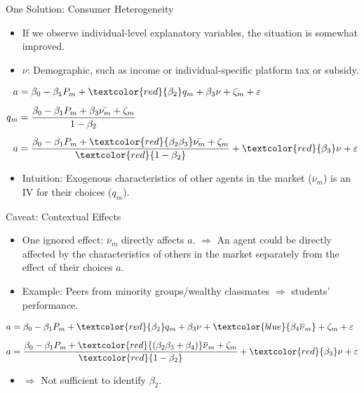 \documentclass[aspectratio=169]{beamer}  %
\begin{document}
\begin{frame}{One Solution: Consumer Heterogeneity}
    \begin{itemize}
        \item If we observe individual-level explanatory variables, the situation is somewhat improved.
        \item $\nu$: Demographic, such as income or individual-specific platform tax or subsidy.
    \end{itemize}
    \begin{align*}
        a &= \beta_0 - \beta_1P_m + \textcolor{red}{\beta_2}q_m + \beta_3\nu + \zeta_m + \varepsilon \\[5pt]
        q_m &= \frac{\beta_0-\beta_1P_m+\beta_3\bar{\nu_m} + \zeta_m}{1-\beta_2} \\[5pt]
        a &= \frac{\beta_0-\beta_1P_m+\textcolor{red}{\beta_2\beta_3}\bar{\nu_m} + \zeta_m}{\textcolor{red}{1-\beta_2}} + \textcolor{red}{\beta_3}\nu + \varepsilon
    \end{align*}
    \vspace{-0.2cm}
    \begin{itemize}
        \item Intuition: Exogenous characteristics of other agents in the market ($\overline{\nu}_m$) is an IV for their choices ($q_m$).
    \end{itemize}
\end{frame}

\begin{frame}{Caveat: Contextual Effects}
    \begin{itemize}
        \item One ignored effect: $\overline{\nu}_m$ directly affects $a$. $\Rightarrow$ An agent could be directly affected by the characteristics of others in the market separately from the effect of their choices $a$.
        \item Example: Peers from minority groups/wealthy classmates $\Rightarrow$ students' performance.
    \end{itemize}
    \begin{align*}
        a &= \beta_0 - \beta_1P_m + \textcolor{red}{\beta_2}q_m + \beta_3\nu + \textcolor{blue}{\beta_4\overline{\nu}_m}+\zeta_m + \varepsilon \\[5pt]
        a &= \frac{\beta_0-\beta_1P_m+\textcolor{red}{(\beta_2\beta_3+\beta_4)}\overline{\nu}_m + \zeta_m}{\textcolor{red}{1-\beta_2}} + \textcolor{red}{\beta_3}\nu + \varepsilon
    \end{align*}
    \begin{itemize}
        \item $\Rightarrow$ Not sufficient to identify $\beta_2$.
    \end{itemize}
\end{frame}
\end{document}
